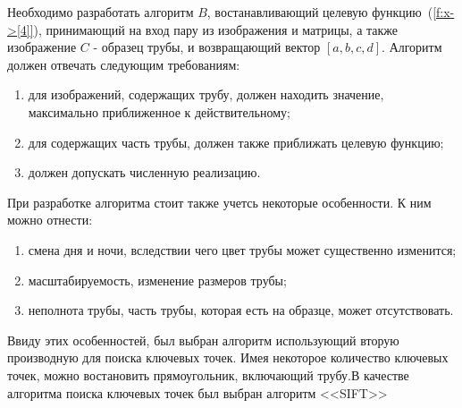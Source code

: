\documentclass[14pt, a4paper]{extreport}
\begin{document}
	Необходимо разработать алгоритм $B$, востанавливающий целевую функцию~(\ref{f:x->[4]}), принимающий на вход пару из изображения и матрицы, а также изображение $C$ - образец трубы, и возвращающий вектор $[a, b, c, d]$. Алгоритм должен отвечать следующим требованиям:
	\begin{enumerate}[label={\arabic*)}]
		\item для изображений, содержащих трубу, должен находить значение, максимально приближенное к действительному;
		\item для содержащих часть трубы, должен также приближать целевую функцию;
		\item должен допускать численную реализацию.
	\end{enumerate}
	
	При разработке алгоритма стоит также учетсь некоторые особенности. К ним можно отнести:
	\begin{enumerate}[label={\arabic*)}]
		\item смена дня и ночи, вследствии чего цвет трубы может существенно изменится;
		\item масштабируемость, изменение размеров трубы;
		\item неполнота трубы, часть трубы, которая есть на образце, может отсутствовать.
	\end{enumerate}
	Ввиду этих особенностей, был выбран алгоритм использующий вторую производную для поиска ключевых точек. Имея некоторое количество ключевых точек, можно востановить прямоугольник, включающий трубу.\linebreak В качестве алгоритма поиска ключевых точек был выбран алгоритм <<SIFT>>
	
\end{document}
